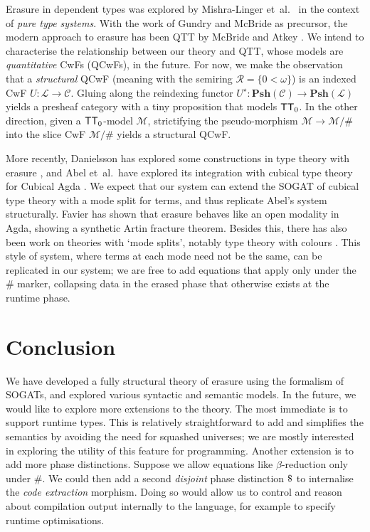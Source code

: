 \documentclass[10pt,a4paper]{article}
\theoremstyle{definition}
\theoremstyle{remark}
\newcommand{\s}[1]{{\ensuremath{\textsf{\upshape #1}}}\xspace}
\newcommand{\cl}[1]{{\ensuremath{\mathcal{#1}}}\xspace}
\newcommand{\re}[1]{{\ensuremath{\mathbf{#1}}}\xspace}
\newcommand{\Psh}[1]{\ensuremath{\re{Psh}({#1})}\xspace}
\newcommand{\ZTT}{\ensuremath{\s{TT}_0}\xspace}
\begin{document}
Erasure in dependent types was explored by Mishra-Linger
et~al.~\cite{Mishra-Linger2008-zy} in the context of \emph{pure type systems}.
With the work of Gundry and McBride \cite{Gundry2013-px} as precursor, the
modern approach to erasure has been QTT by McBride \cite{McBride2016-oa} and
Atkey \cite{Atkey2018-pj}. We intend to characterise the relationship between
our theory and QTT, whose models are \emph{quantitative} CwFs (QCwFs), in the
future. For now, we make the observation that a \emph{structural} QCwF (meaning
with the semiring $\cl R = \{0 < \omega\}$) is an indexed CwF $U : \cl L \to \cl
C$. Gluing along the reindexing functor $U^\star : \Psh{\cl C} \to \Psh{\cl
L}$ yields a presheaf category with a tiny proposition that models \ZTT. In the
other direction, given a \ZTT-model $\cl M$, strictifying the pseudo-morphism
$\cl M \to \cl M / \#$ into the slice CwF $\cl M / \#$ yields a
structural QCwF.

More recently, Danielsson has explored some constructions in type theory with
erasure \cite{Danielsson_undated-pj}, and Abel et~al.~have explored its
integration with cubical type theory for Cubical Agda \cite{AbelUnknown-od}. We
expect that our system can extend the SOGAT of cubical type theory
\cite[4.6.3]{Uemura2021-jq} with a mode split for terms, and thus replicate
Abel's system structurally. Favier \cite{FavierUnknown-wx} has shown that
erasure behaves like an open modality in Agda, showing a synthetic Artin
fracture theorem. Besides this, there has also been work on theories with `mode
splits', notably type theory with colours \cite{Jean-Philippe2013-js}. This
style of system, where terms at each mode need not be the same, can be
replicated in our system; we are free to add equations that apply only under the
$\#$ marker, collapsing data in the erased phase that otherwise exists at the
runtime phase. 

\section{Conclusion}\label{sec:concl}

We have developed a fully structural theory of erasure using the formalism of
SOGATs, and explored various syntactic and semantic models.  
In the future, we would like to explore more extensions to the theory. The most
immediate is to support runtime types. This is relatively straightforward to add
and simplifies the semantics by avoiding the need for squashed universes; we are
mostly interested in exploring the utility of this feature for programming.
Another extension is to add more phase distinctions. Suppose we allow equations
like $\beta$-reduction only under $\#$. We could then add a second
\emph{disjoint} phase distinction $\text{\textdollar}$ to internalise the \emph{code
extraction} morphism. Doing so would allow us to control and reason about
compilation output internally to the language, for example to specify runtime
optimisations.
\end{document}

